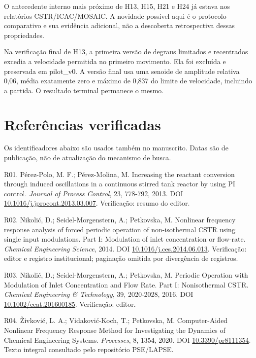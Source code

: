 \documentclass[
  11pt,
  letterpaper,
]{article}
\begin{document}
O antecedente interno mais próximo de H13, H15, H21 e H24 já estava nos
relatórios CSTR/ICAC/MOSAIC. A novidade possível aqui é o protocolo
comparativo e sua evidência adicional, não a descoberta retrospectiva
dessas propriedades.

Na verificação final de H13, a primeira versão de degraus limitados e
recentrados excedia a velocidade permitida no primeiro movimento. Ela
foi excluída e preservada em pilot\_\allowbreak{}v0. A versão final usa uma senoide
de amplitude relativa 0,06, média exatamente zero e máximo de 0,837 do
limite de velocidade, incluindo a partida. O resultado terminal
permanece o mesmo.

\hypertarget{referuxeancias-verificadas}{%
\section{Referências verificadas}\label{referuxeancias-verificadas}}

Os identificadores abaixo são usados também no manuscrito. Datas são de
publicação, não de atualização do mecanismo de busca.

R01. Pérez-Polo, M. F.; Pérez-Molina, M. Increasing the reactant
conversion through induced oscillations in a continuous stirred tank
reactor by using PI control. \emph{Journal of Process Control}, 23,
778-792, 2013. DOI
\href{https://doi.org/10.1016/j.jprocont.2013.03.007}{10.1016/j.jprocont.2013.03.007}.
Verificação: resumo do editor.

R02. Nikolić, D.; Seidel-Morgenstern, A.; Petkovska, M. Nonlinear
frequency response analysis of forced periodic operation of
non-isothermal CSTR using single input modulations. Part I: Modulation
of inlet concentration or flow-rate. \emph{Chemical Engineering
Science}, 2014. DOI
\href{https://doi.org/10.1016/j.ces.2014.06.013}{10.1016/j.ces.2014.06.013}.
Verificação: editor e registro institucional; paginação omitida por
divergência de registros.

R03. Nikolić, D.; Seidel-Morgenstern, A.; Petkovska, M. Periodic
Operation with Modulation of Inlet Concentration and Flow Rate. Part I:
Nonisothermal CSTR. \emph{Chemical Engineering \& Technology}, 39,
2020-2028, 2016. DOI
\href{https://doi.org/10.1002/ceat.201600185}{10.1002/ceat.201600185}.
Verificação: editor.

R04. Živković, L. A.; Vidaković-Koch, T.; Petkovska, M. Computer-Aided
Nonlinear Frequency Response Method for Investigating the Dynamics of
Chemical Engineering Systems. \emph{Processes}, 8, 1354, 2020. DOI
\href{https://doi.org/10.3390/pr8111354}{10.3390/pr8111354}. Texto
integral consultado pelo repositório PSE/LAPSE.
\end{document}
